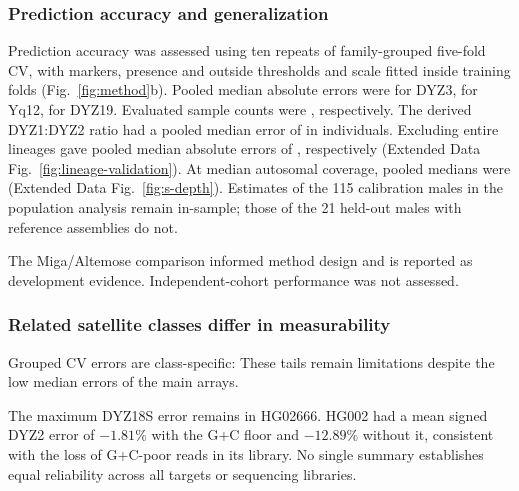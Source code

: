\subsubsection{Prediction accuracy and generalization}\label{sec:res-benchmark}
Prediction accuracy was assessed using ten repeats of family-grouped five-fold CV, with markers, presence and outside thresholds and scale fitted inside training folds (Fig.~\ref{fig:method}b). Pooled median absolute errors were  for DYZ3,  for Yq12,  for DYZ19. Evaluated sample counts were , respectively. The derived DYZ1:DYZ2 ratio had a pooled median error of  in  individuals. Excluding entire lineages gave pooled median absolute errors of , respectively (Extended Data Fig.~\ref{fig:lineage-validation}). At  median autosomal coverage, pooled medians were  (Extended Data Fig.~\ref{fig:s-depth}). Estimates of the 115 calibration males in the population analysis remain in-sample; those of the 21 held-out males with reference assemblies do not.

The Miga/Altemose comparison informed method design \cite{Miga2014,Altemose2014} and is reported as development evidence.  Independent-cohort performance was not assessed.


\subsubsection{Related satellite classes differ in measurability}\label{sec:res-classes}
Grouped CV errors are class-specific:  These tails remain limitations despite the low median errors of the main arrays.

 The maximum DYZ18S error remains  in HG02666.  HG002 had a mean signed DYZ2 error of $-1.81\%$ with the G+C floor and $-12.89\%$ without it, consistent with the loss of G+C-poor reads in its library. No single summary establishes equal reliability across all targets or sequencing libraries.

